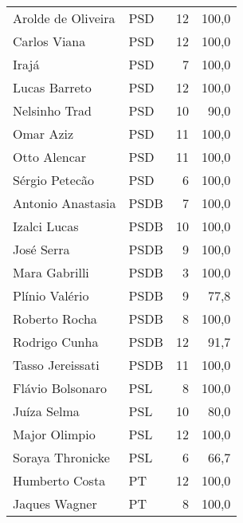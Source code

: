 \begin{longtable}{llrr}
      Arolde de Oliveira &            PSD &                  12 &        100,0 \\
            Carlos Viana &            PSD &                  12 &        100,0 \\
                   Irajá &            PSD &                   7 &        100,0 \\
           Lucas Barreto &            PSD &                  12 &        100,0 \\
           Nelsinho Trad &            PSD &                  10 &         90,0 \\
               Omar Aziz &            PSD &                  11 &        100,0 \\
            Otto Alencar &            PSD &                  11 &        100,0 \\
          Sérgio Petecão &            PSD &                   6 &        100,0 \\
       Antonio Anastasia &           PSDB &                   7 &        100,0 \\
            Izalci Lucas &           PSDB &                  10 &        100,0 \\
              José Serra &           PSDB &                   9 &        100,0 \\
           Mara Gabrilli &           PSDB &                   3 &        100,0 \\
          Plínio Valério &           PSDB &                   9 &         77,8 \\
           Roberto Rocha &           PSDB &                   8 &        100,0 \\
           Rodrigo Cunha &           PSDB &                  12 &         91,7 \\
        Tasso Jereissati &           PSDB &                  11 &        100,0 \\
        Flávio Bolsonaro &            PSL &                   8 &        100,0 \\
             Juíza Selma &            PSL &                  10 &         80,0 \\
           Major Olimpio &            PSL &                  12 &        100,0 \\
        Soraya Thronicke &            PSL &                   6 &         66,7 \\
          Humberto Costa &             PT &                  12 &        100,0 \\
           Jaques Wagner &             PT &                   8 &        100,0 \\

\end{longtable}
